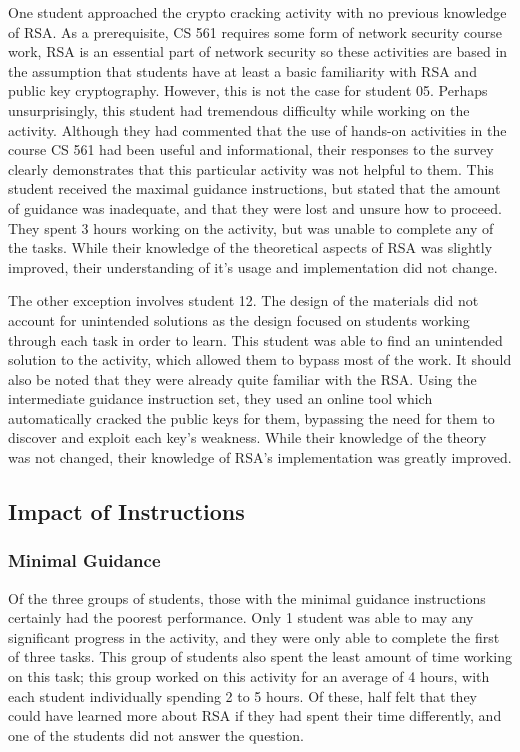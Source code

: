         One student approached the crypto cracking activity with no previous knowledge of RSA. As a prerequisite, CS 561 requires some form of network security course work, RSA is an essential part of network security so these activities are based in the assumption that students have at least a basic familiarity with RSA and public key cryptography. %
However, this is not the case for student 05. %
Perhaps unsurprisingly, this student had tremendous difficulty while working on the activity. %
Although they had commented that the use of hands-on activities in the course CS 561 had been useful and informational, their responses to the survey clearly demonstrates that this particular activity was not helpful to them. %
This student received the maximal guidance instructions, but stated that the amount of guidance was inadequate, and that they were lost and unsure how to proceed. %
They spent 3 hours working on the activity, but was unable to complete any of the tasks. %
While their knowledge of the theoretical aspects of RSA was slightly improved, their understanding of it's usage and implementation did not change. 

        The other exception involves student 12. %
The design of the materials did not account for unintended solutions as the design focused on students working through each task in order to learn. %
This student was able to find an unintended solution to the activity, which allowed them to bypass most of the work. %
It should also be noted that they were already quite familiar with the RSA. Using the intermediate guidance instruction set, they used an online tool which automatically cracked the public keys for them, bypassing the need for them to discover and exploit each key's weakness. %
While their knowledge of the theory was not changed, their knowledge of RSA's implementation was greatly improved. 

    \subsection{Impact of Instructions}
        \subsubsection*{Minimal Guidance}
            Of the three groups of students, those with the minimal guidance instructions certainly had the poorest performance. %
Only 1 student was able to may any significant progress in the activity, and they were only able to complete the first of three tasks. %
This group of students also spent the least amount of time working on this task; %
this group worked on this activity for an average of 4 hours, with each student individually spending 2 to 5 hours. %
Of these, half felt that they could have learned more about RSA if they had spent their time differently, and one of the students did not answer the question. 

